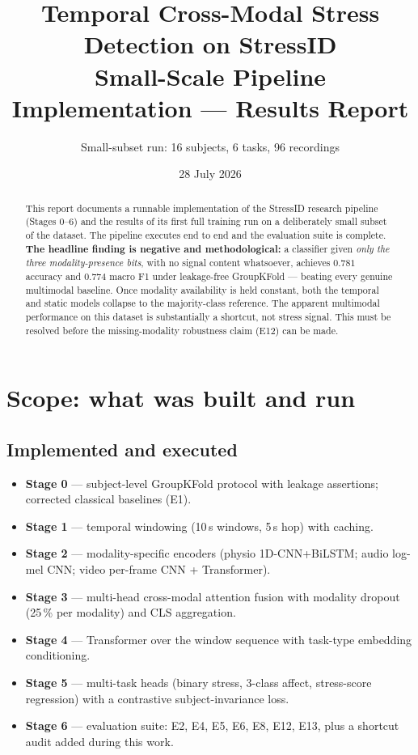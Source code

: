 \documentclass[11pt,a4paper]{article}
\title{\textbf{Temporal Cross-Modal Stress Detection on StressID}\\
       \large Small-Scale Pipeline Implementation --- Results Report}
\author{Small-subset run: 16 subjects, 6 tasks, 96 recordings}
\date{28 July 2026}
\newcommand{\alert}[1]{\textcolor{alertred}{\textbf{#1}}}
\begin{document}
\maketitle

\begin{abstract}
\noindent
This report documents a runnable implementation of the StressID research pipeline
(Stages 0--6) and the results of its first full training run on a deliberately small
subset of the dataset. The pipeline executes end to end and the evaluation suite is
complete. \alert{The headline finding is negative and methodological:} a
classifier given \emph{only the three modality-presence bits}, with no signal content
whatsoever, achieves $0.781$ accuracy and $0.774$ macro F1 under leakage-free
GroupKFold --- beating every genuine multimodal baseline. Once modality availability is
held constant, both the temporal and static models collapse to the majority-class
reference. The apparent multimodal performance on this dataset is substantially a
shortcut, not stress signal. This must be resolved before the missing-modality
robustness claim (E12) can be made.
\end{abstract}

\tableofcontents
\vspace{1em}

\section{Scope: what was built and run}

\subsection*{Implemented and executed}
\begin{itemize}\itemsep2pt
  \item \textbf{Stage 0} --- subject-level GroupKFold protocol with leakage assertions;
        corrected classical baselines (E1).
  \item \textbf{Stage 1} --- temporal windowing (10\,s windows, 5\,s hop) with caching.
  \item \textbf{Stage 2} --- modality-specific encoders (physio 1D-CNN+BiLSTM;
        audio log-mel CNN; video per-frame CNN + Transformer).
  \item \textbf{Stage 3} --- multi-head cross-modal attention fusion with modality
        dropout (25\,\% per modality) and CLS aggregation.
  \item \textbf{Stage 4} --- Transformer over the window sequence with task-type
        embedding conditioning.
  \item \textbf{Stage 5} --- multi-task heads (binary stress, 3-class affect,
        stress-score regression) with a contrastive subject-invariance loss.
  \item \textbf{Stage 6} --- evaluation suite: E2, E4, E5, E6, E8, E12, E13, plus a
        shortcut audit added during this work.
\end{itemize}
\end{document}
